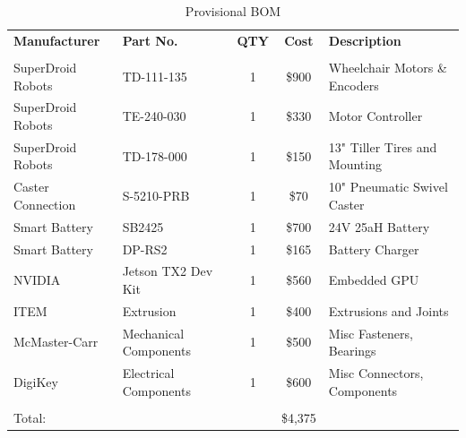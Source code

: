 \documentclass[12pt]{extarticle}
\begin{document}
\begin{table}[H]
\centering
\def\arraystretch{1.1}
\caption{Provisional BOM}
\label{Tab:provisional_bom}
\begin{tabular}{ llccl }
\hline
    \sffamily\textbf{Manufacturer} & \sffamily\textbf{Part No.} & \sffamily\textbf{QTY} & \sffamily\textbf{Cost} & \sffamily\textbf{Description}\\
    \\[-.8ex]
    SuperDroid Robots & TD-111-135 & 1 & \$900 & Wheelchair Motors \& Encoders \\
	SuperDroid Robots & TE-240-030 & 1 & \$330 & Motor Controller \\
	SuperDroid Robots & TD-178-000 & 1 & \$150 & 13" Tiller Tires and Mounting \\
	Caster Connection & S-5210-PRB & 1 & \$70 & 10" Pneumatic Swivel Caster \\
	Smart Battery & SB2425 & 1 & \$700 & 24V 25aH Battery \\
    Smart Battery & DP-RS2 & 1 & \$165 & Battery Charger \\
    NVIDIA & Jetson TX2 Dev Kit & 1 & \$560 &  Embedded GPU \\
	ITEM & Extrusion & 1 & \$400 & Extrusions and Joints \\
	McMaster-Carr & Mechanical Components & 1 & \$500 & Misc Fasteners, Bearings \\
	DigiKey & Electrical Components & 1 & \$600 & Misc Connectors, Components \\[.5ex]
	\hline 
	\\[-2ex]
	Total: &&& \$4,375 &\\
	
    
\end{tabular}
\end{table}
\end{document}
